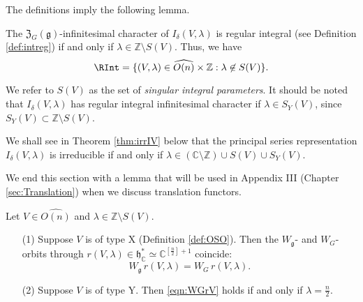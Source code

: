 The definitions imply the following lemma.  
\begin{lemma}
\label{lem:regint}
The ${\mathfrak {Z}}_G({\mathfrak{g}})$-infinitesimal character
 of $I_{\delta}(V,\lambda)$ is regular integral 
 (see Definition \ref{def:intreg})
 if and only if $\lambda \in {\mathbb{Z}} \setminus S(V)$.  
Thus, 
 we have
\[
\RInt =\{(V,\lambda) \in \widehat{O(n)} \times {\mathbb{Z}}
:
 \lambda \not \in S(V) \}.  
\]
\end{lemma}
We refer to $S(V)$ 
as the set of 
 {\it{singular integral parameters}}.  
It should be noted
 that $I_{\delta}(V,\lambda)$ has
 regular integral infinitesimal character
 if $\lambda \in S_Y(V)$, 
 since $S_Y(V) \subset {\mathbb{Z}} \setminus S(V)$.  



We shall see in Theorem \ref{thm:irrIV} below
 that the principal series representation $I_{\delta}(V, \lambda)$ is
 irreducible
 if and only if 
 $\lambda \in ({\mathbb{C}} \setminus {\mathbb{Z}}) \cup S(V) \cup S_Y(V)$.  



We end this section with a lemma
 that will be used in Appendix III
 (Chapter \ref{sec:Translation})
 when we discuss translation functors.  

\begin{lemma}
\label{lem:1806115}
Let $V \in \widehat{O(n)}$
 and $\lambda \in {\mathbb{Z}} \setminus S(V)$.  
\begin{enumerate}
\item[{\rm{(1)}}]
Suppose $V$ is of type X (Definition \ref{def:OSO}).  
Then the $W_{\mathfrak{g}}$- and $W_G$-orbits
 through
 $r(V,\lambda) \in {\mathfrak{h}}_{\mathbb{C}}^{\ast} \simeq {\mathbb{C}}^{[\frac n 2]+1}$
 coincide:
\begin{equation}
\label{eqn:WGrV}
W_{\mathfrak{g}}\, r(V,\lambda)
=
W_G\, r(V,\lambda).  
\end{equation}
\item[{\rm{(2)}}]
Suppose $V$ is of type Y.  
Then \eqref{eqn:WGrV} holds
 if and only if $\lambda=\frac n 2$.  
\end{enumerate}
\end{lemma}



